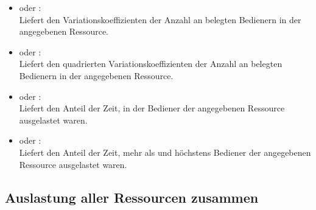 \begin{itemize}
\item
{} oder :\\
Liefert den Variationskoeffizienten der Anzahl an belegten Bedienern in der angegebenen Ressource.

\item
{} oder :\\
Liefert den quadrierten Variationskoeffizienten der Anzahl an belegten Bedienern in der angegebenen Ressource.  

\item
{} oder :\\
Liefert den Anteil der Zeit, in der  Bediener der angegebenen Ressource ausgelastet waren.

\item
{} oder :\\
Liefert den Anteil der Zeit, mehr als  und höchstens  Bediener der angegebenen Ressource ausgelastet waren.

\end{itemize}



\subsection{Auslastung aller Ressourcen zusammen}

